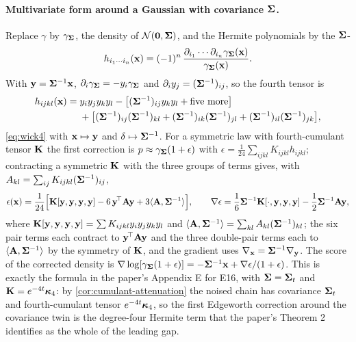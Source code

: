 \paragraph{Multivariate form around a Gaussian with covariance $\mathbf{\Sigma}$.}
Replace $\gamma$ by $\gamma_{\mathbf{\Sigma}}$, the density of $\mathcal{N}\!\left(\mathbf{0},\mathbf{\Sigma}\right)$, and the
Hermite polynomials by the $\mathbf{\Sigma}$-
\[
  h_{i_1\cdots i_n}(\mathbf{x})=(-1)^n\,\frac{\partial_{i_1}\cdots\partial_{i_n}\gamma_{\mathbf{\Sigma}}(\mathbf{x})}{\gamma_{\mathbf{\Sigma}}(\mathbf{x})} .
\]
With $\mathbf{y}=\mathbf{\Sigma}^{-1}\mathbf{x}$, $\partial_i\gamma_{\mathbf{\Sigma}}=-y_i\gamma_{\mathbf{\Sigma}}$ and
$\partial_iy_j=(\mathbf{\Sigma}^{-1})_{ij}$, so the fourth tensor is
\begin{equation}
\begin{aligned}
  h_{ijkl}(\mathbf{x})={}&y_iy_jy_ky_l-\bigl[(\mathbf{\Sigma}^{-1})_{ij}y_ky_l+\text{five more}\bigr]\\
  &+\bigl[(\mathbf{\Sigma}^{-1})_{ij}(\mathbf{\Sigma}^{-1})_{kl}+(\mathbf{\Sigma}^{-1})_{ik}(\mathbf{\Sigma}^{-1})_{jl}+(\mathbf{\Sigma}^{-1})_{il}(\mathbf{\Sigma}^{-1})_{jk}\bigr],
\end{aligned}
\end{equation}
\cref{eq:wick4} with $\mathbf{x}\mapsto\mathbf{y}$ and $\delta\mapsto\mathbf{\Sigma}^{-1}$. For a symmetric
law with fourth-cumulant tensor $\mathbf{K}$ the first correction is
$p\approx\gamma_{\mathbf{\Sigma}}(1+\epsilon)$ with $\epsilon=\tfrac1{24}\sum_{ijkl}K_{ijkl}h_{ijkl}$;
contracting a symmetric $\mathbf{K}$ with the three groups of terms gives, with
$A_{kl}=\sum_{ij}K_{ijkl}(\mathbf{\Sigma}^{-1})_{ij}$,
\begin{equation}
  \epsilon(\mathbf{x})=\frac1{24}\Bigl[\mathbf{K}[\mathbf{y},\mathbf{y},\mathbf{y},\mathbf{y}]-6\,\mathbf{y}^{\!\top}\mathbf{A}\mathbf{y}+3\langle\mathbf{A},\mathbf{\Sigma}^{-1}\rangle\Bigr],
  \qquad
  \nabla\epsilon=\frac16\mathbf{\Sigma}^{-1}\mathbf{K}[\cdot,\mathbf{y},\mathbf{y},\mathbf{y}]-\frac12\mathbf{\Sigma}^{-1}\mathbf{A}\mathbf{y},
  \label{eq:edgeworth-multi}
\end{equation}
where $\mathbf{K}[\mathbf{y},\mathbf{y},\mathbf{y},\mathbf{y}]=\sum K_{ijkl}y_iy_jy_ky_l$ and
$\langle\mathbf{A},\mathbf{\Sigma}^{-1}\rangle=\sum_{kl}A_{kl}(\mathbf{\Sigma}^{-1})_{kl}$; the six pair terms
each contract to $\mathbf{y}^{\!\top}\mathbf{A}\mathbf{y}$ and the three double-pair terms each to
$\langle\mathbf{A},\mathbf{\Sigma}^{-1}\rangle$ by the symmetry of $\mathbf{K}$, and the gradient uses
$\nabla_{\mathbf{x}}=\mathbf{\Sigma}^{-1}\nabla_{\mathbf{y}}$. The score of the corrected density is
$\nabla\log[\gamma_{\mathbf{\Sigma}}(1+\epsilon)]=-\mathbf{\Sigma}^{-1}\mathbf{x}+\nabla\epsilon/(1+\epsilon)$. This is
exactly the formula in the paper's Appendix E for E16, with $\mathbf{\Sigma}=\mathbf{\Sigma}_t$ and
$\mathbf{K}=e^{-4t}\bm{\kappa}_4$: by \cref{cor:cumulant-attenuation} the noised chain has
covariance $\mathbf{\Sigma}_t$ and fourth-cumulant tensor $e^{-4t}\bm{\kappa}_4$, so the first
Edgeworth correction around the covariance twin is the degree-four Hermite term that
the paper's Theorem 2 identifies as the whole of the leading gap.

